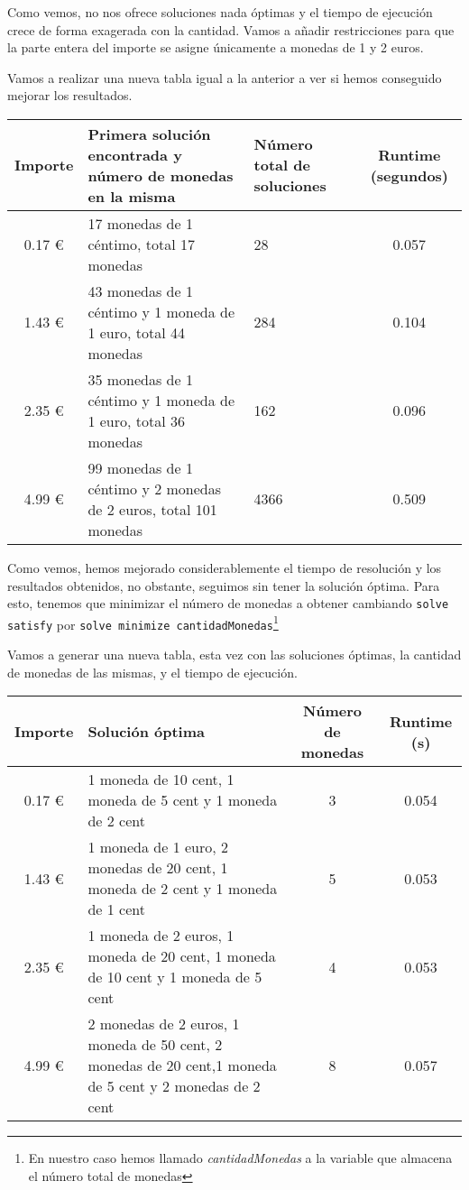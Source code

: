 Como vemos, no nos ofrece soluciones nada óptimas y el tiempo de ejecución crece de forma exagerada con la cantidad. Vamos a añadir restricciones para que la parte entera del importe se asigne únicamente a monedas de 1 y 2 euros.

Vamos a realizar una nueva tabla igual a la anterior a ver si hemos conseguido mejorar los resultados.

\begin{tabular}{|c|p{}|p{}|c|}
    \hline
    Importe & Primera solución encontrada y número de monedas en la misma & Número total de soluciones & Runtime (segundos) \\
    \hline 0.17 € & 17 monedas de 1 céntimo, total 17 monedas & 28 & 0.057\\
    \hline 1.43 € & 43 monedas de 1 céntimo y 1 moneda de 1 euro, total 44 monedas & 284 & 0.104\\
    \hline 2.35 € & 35 monedas de 1 céntimo y 1 moneda de 1 euro, total 36 monedas & 162 & 0.096 \\
    \hline 4.99 € & 99 monedas de 1 céntimo y 2 monedas de 2 euros, total 101 monedas & 4366 & 0.509 \\
    \hline
\end{tabular}


Como vemos, hemos mejorado considerablemente el tiempo de resolución y los resultados obtenidos, no obstante, seguimos sin tener la solución óptima. Para esto, tenemos que minimizar el número de monedas a obtener cambiando \texttt{solve satisfy} por \texttt{solve minimize cantidadMonedas}\footnote{En nuestro caso hemos llamado \textit{cantidadMonedas} a la variable que almacena el número total de monedas}

Vamos a generar una nueva tabla, esta vez con las soluciones óptimas, la cantidad de monedas de las mismas, y el tiempo de ejecución.

\begin{tabular}{|c|p{}|c|c|}
    \hline
    Importe & Solución óptima & Número de monedas & Runtime (s)\\
    \hline 0.17 € & 1 moneda de 10 cent, 1 moneda de 5 cent y 1 moneda de 2 cent & 3 & 0.054\\
    \hline 1.43 € & 1 moneda de 1 euro, 2 monedas de 20 cent, 1 moneda de 2 cent y 1 moneda de 1 cent & 5 & 0.053\\
    \hline 2.35 € & 1 moneda de 2 euros, 1 moneda de 20 cent, 1 moneda de 10 cent y 1 moneda de 5 cent & 4 & 0.053\\
    \hline 4.99 € & 2 monedas de 2 euros, 1 moneda de 50 cent, 2 monedas de 20 cent,1 moneda de 5 cent y 2 monedas de 2 cent & 8 & 0.057\\
    \hline
\end{tabular}

